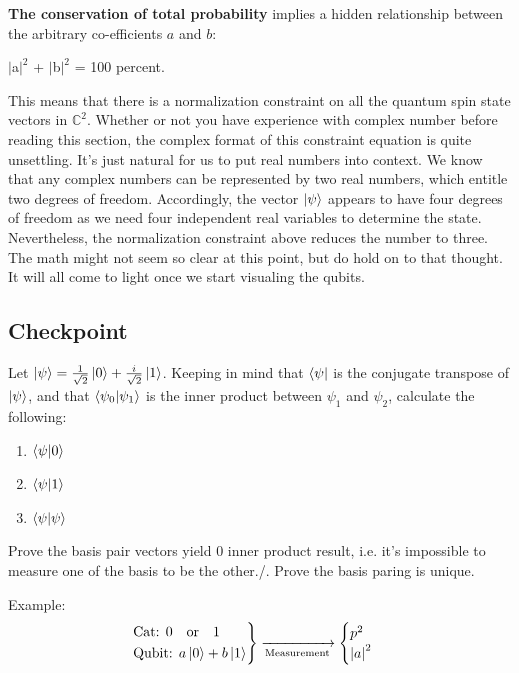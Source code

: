 \documentclass[12pt]{article}
\begin{document}
\textbf{The conservation of total probability} implies a hidden relationship between the arbitrary co-efficients $a$ and $b$:
\begin{center}
$|$a$|^2$ + $|$b$|^2$ = 100 percent.
\end{center}
This means that there is a normalization constraint on all the quantum spin state vectors in $\mathbb{C}^2$. Whether or not you have experience with complex number before reading this section, the complex format of this constraint equation is quite unsettling. It's just natural for us to put real numbers into context. We know that any complex numbers can be represented by two real numbers, which entitle two degrees of freedom. Accordingly, the vector $\ket{\psi}$ appears to have four degrees of freedom as we need four independent real variables to determine the state. Nevertheless, the normalization constraint above reduces the number to three. The math might not seem so clear at this point, but do hold on to that thought. It will all come to light once we start visualing the qubits.

\subsection{Checkpoint}
Let $\ket{\psi} = \frac{1}{\sqrt{2}}\ket{0} + \frac{i}{\sqrt{2}}\ket{1}$. Keeping in mind that $\bra{\psi}$ is the conjugate transpose of $\ket{\psi}$, and that $\braket{\psi_0}{\psi_1}$ is the inner product between $\psi_1$ and $\psi_2$, calculate the following:
\begin{enumerate}
    \item $\braket{\psi}{0}$
    \item $\braket{\psi}{1}$
    \item $\braket{\psi}{\psi}$
\end{enumerate}

Prove the basis pair vectors yield 0 inner product result, i.e. it’s impossible to measure one of the basis to be the other./.
Prove the basis paring is unique.

Example:
\[
\begin{rcases}
	\text{Cat: } 0 \qq{or} 1\\
	\text{Qubit: } a\ket{0} + b\ket{1}
\end{rcases}
\xrightarrow[\text{Measurement}]{}
\begin{cases}
p^2 \\ \abs{a}^2
\end{cases}
\]
\end{document}

